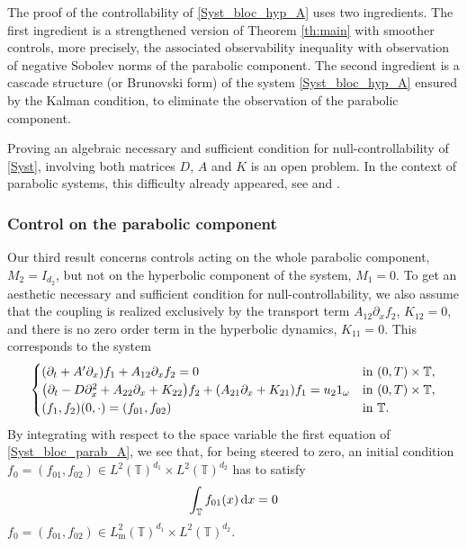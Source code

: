 \documentclass[JEP,XML,SOM,Unicode,NoEqCountersInSection]{cedram}
\theoremstyle{plain}
\theoremstyle{definition}
\theoremstyle{remark}
\newcommand{\diff}[1][-3]{\ensuremath{\mathop{}\mkern#1mu\mathrm{d}}}
\newcommand{\set}{\mathbb}
\newcommand{\T}{\set{T}}
\newcommand{\m}{{\mathrm m}}
\let\originalleft\left
\let\originalright\right
\renewcommand{\left}{\mathopen{}\mathclose\bgroup\originalleft}
\renewcommand{\right}{\aftergroup\egroup\originalright}
\begin{document}
The proof of the controllability of \eqref{Syst_bloc_hyp_A} uses two ingredients. The first ingredient is a strengthened version of Theorem \ref{th:main} with smoother controls, more precisely, the associated observability inequality with observation of negative Sobolev norms of the parabolic component. The second ingredient is a cascade structure (or Brunovski form) of the system \eqref{Syst_bloc_hyp_A} ensured by the Kalman condition, to eliminate the observation of the parabolic component.

Proving an algebraic necessary and sufficient condition for null-controllability of \eqref{Syst}, involving both matrices $D$, $A$ and $K$ is an open problem.
In the context of parabolic systems, this difficulty already appeared, see
\cite{ammarkhodja_2009} and \cite{duprez_2016a}.

\subsubsection{Control on the parabolic component}

Our third result concerns controls acting on the whole parabolic component, $M_2=I_{d_2}$, but not on the hyperbolic component of the system, $M_1=0$. To get an aesthetic necessary and sufficient condition for null-controllability, we also assume that the coupling is realized exclusively by the transport term $A_{12}\partial_x f_2$, \ie $K_{12}=0$, and there is no zero order term in the hyperbolic dynamics, \ie $K_{11}=0$. This corresponds to the system
\begin{equation} \label{Syst_bloc_parab_A}
\begin{cases}
\left(\partial_t +A'\partial_x \right)f_1+ A_{12}\partial_x f_2= 0
&\text{in}\ (0,T)\times \T,\\
\left(\partial_t - D \partial_x^2+A_{22}\partial_x+K_{22}\right)f_2 + (A_{21}\partial_x + K_{21}) f_1 = u_2 1_\omega &\text{in}\ (0,T)\times \T,\\
(f_1,f_2)(0,\cdot)=(f_{01},f_{02}) & \text{in}\ \T.
\end{cases}
\end{equation}
By integrating with respect to the space variable the first equation of \eqref{Syst_bloc_parab_A}, we see that, for being steered to zero, an initial condition $f_0=(f_{01},f_{02})\in L^2(\T)^{d_1} \times L^2(\T)^{d_2}$ has to satisfy
\begin{equation} \label{Hyp_A_contrainte_parab}
\int_{\T} f_{01}(x) \diff x =0
\end{equation}
\ie $f_0=(f_{01},f_{02})\in L^2_\m(\T)^{d_1} \times L^2(\T)^{d_2}$.
\end{document}

